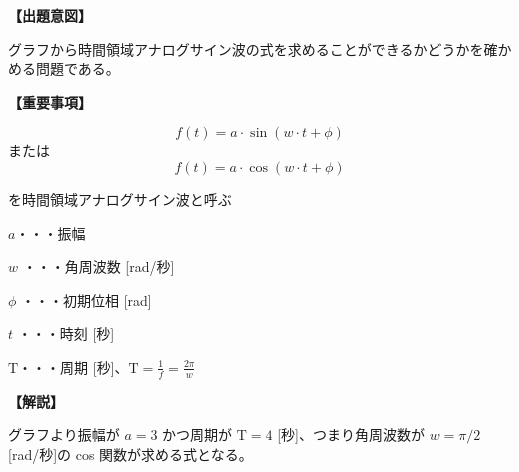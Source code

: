 \noindent \textbf{【出題意図】}

\noindent グラフから時間領域アナログサイン波の式を求めることができるかどうかを確かめる問題である。

\vspace{1em}
\noindent \textbf{【重要事項】}

\[
f(t) = a \cdot \sin( w \cdot t + \phi )
\]
%
\noindent または
%
\[
f(t) = a \cdot \cos( w \cdot t + \phi )
\]

\medskip
\noindent を時間領域アナログサイン波と呼ぶ

\bigskip
\noindent $a$・・・振幅

\bigskip
\noindent $w$ ・・・角周波数 [rad/秒]

\bigskip
\noindent $\phi$ ・・・初期位相 [rad]

\bigskip
\noindent $t$ ・・・時刻 [秒]

\bigskip
$\textrm{T}$・・・周期 [秒]、$\textrm{T} = \frac{1}{f} = \frac{2\pi}{w}$

\vspace{1em}
\noindent \textbf{【解説】}

\noindent グラフより振幅が $a = 3$ かつ周期が $\textrm{T} = 4$ [秒]、つまり角周波数が $w = \pi/2$ [rad/秒]の cos 関数が求める式となる。
